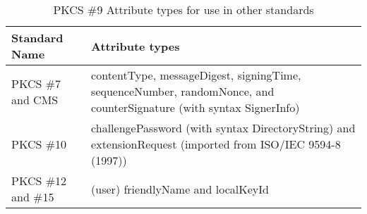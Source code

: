 \documentclass{article}
\begin{document}
\vspace{-0.7cm}
\begin{center}
\begin{table}[htb]
\caption{PKCS \#9 Attribute types for use in other standards}
\label{pkcs9attributes}
\begin{center}
\begin{tabular}{|l|p{10cm}|}\hline
{\bf Standard Name} & {\bf Attribute types}\\ \hline
PKCS \#7 and CMS &  contentType, messageDigest, signingTime, 
sequenceNumber, randomNonce, and counterSignature 
(with syntax {SignerInfo})\\ \hline
PKCS \#10 & {challengePassword} (with syntax {DirectoryString}) and
{extensionRequest} (imported from 
ISO/IEC 9594-8 (1997))\\ \hline
PKCS \#12 and \#15 & (user) {friendlyName} and
{localKeyId}\\ \hline
\end{tabular}
\end{center}
\end{table}
\end{center}
\end{document}
